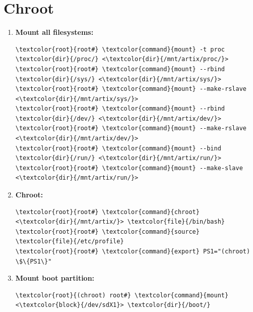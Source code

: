 \documentclass[10pt, a4paper, onecolumn, oneside, titlepage, openany]{book}
\begin{document}
\section{Chroot}
\begin{enumerate}
    \item \textbf{Mount all filesystems:}
\begin{Verbatim}[commandchars=\\\{\}]
\textcolor{root}{root#} \textcolor{command}{mount} -t proc \textcolor{dir}{/proc/} <\textcolor{dir}{/mnt/artix/proc/}>
\textcolor{root}{root#} \textcolor{command}{mount} --rbind \textcolor{dir}{/sys/} <\textcolor{dir}{/mnt/artix/sys/}>
\textcolor{root}{root#} \textcolor{command}{mount} --make-rslave <\textcolor{dir}{/mnt/artix/sys/}>
\textcolor{root}{root#} \textcolor{command}{mount} --rbind \textcolor{dir}{/dev/} <\textcolor{dir}{/mnt/artix/dev/}>
\textcolor{root}{root#} \textcolor{command}{mount} --make-rslave <\textcolor{dir}{/mnt/artix/dev/}>
\textcolor{root}{root#} \textcolor{command}{mount} --bind \textcolor{dir}{/run/} <\textcolor{dir}{/mnt/artix/run/}>
\textcolor{root}{root#} \textcolor{command}{mount} --make-slave <\textcolor{dir}{/mnt/artix/run/}>
\end{Verbatim}
    \item \textbf{Chroot:}
\begin{Verbatim}[commandchars=\\\{\}]
\textcolor{root}{root#} \textcolor{command}{chroot} <\textcolor{dir}{/mnt/artix/}> \textcolor{file}{/bin/bash}
\textcolor{root}{root#} \textcolor{command}{source} \textcolor{file}{/etc/profile}
\textcolor{root}{root#} \textcolor{command}{export} PS1="(chroot) \$\{PS1\}"
\end{Verbatim}
    \item \textbf{Mount boot partition:}
\begin{Verbatim}[commandchars=\\\{\}]
\textcolor{root}{(chroot) root#} \textcolor{command}{mount} <\textcolor{block}{/dev/sdX1}> \textcolor{dir}{/boot/}
\end{Verbatim}
\end{enumerate}
\end{document}
